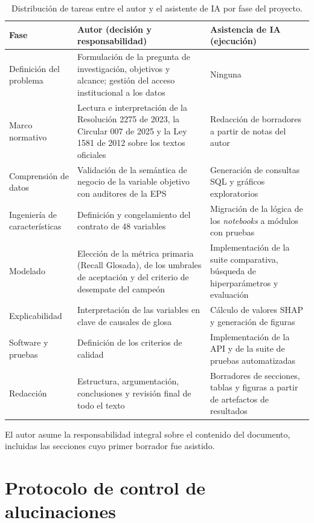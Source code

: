 \documentclass[12pt,letterpaper]{report}
\begin{document}
\begin{table}[H]
\centering
\caption{Distribución de tareas entre el autor y el asistente de IA por fase del proyecto.}
\label{tab:responsabilidad_ia}
\small
\begin{tabular}{@{}p{3cm}p{5.7cm}p{5.6cm}@{}}
\toprule
\textbf{Fase} & \textbf{Autor (decisión y responsabilidad)} & \textbf{Asistencia de IA (ejecución)} \\
\midrule
Definición del problema & Formulación de la pregunta de investigación, objetivos y
alcance; gestión del acceso institucional a los datos & Ninguna \\
Marco normativo & Lectura e interpretación de la Resolución 2275 de 2023, la Circular
007 de 2025 y la Ley 1581 de 2012 sobre los textos oficiales & Redacción de borradores
a partir de notas del autor \\
Comprensión de datos & Validación de la semántica de negocio de la variable objetivo
con auditores de la EPS & Generación de consultas SQL y gráficos exploratorios \\
Ingeniería de características & Definición y congelamiento del contrato de 48
variables & Migración de la lógica de los \textit{notebooks} a módulos con pruebas \\
Modelado & Elección de la métrica primaria (Recall Glosada), de los umbrales de
aceptación y del criterio de desempate del campeón & Implementación de la suite
comparativa, búsqueda de hiperparámetros y evaluación \\
Explicabilidad & Interpretación de las variables en clave de causales de glosa & Cálculo
de valores SHAP y generación de figuras \\
Software y pruebas & Definición de los criterios de calidad & Implementación de la API
y de la suite de pruebas automatizadas \\
Redacción & Estructura, argumentación, conclusiones y revisión final de todo el texto &
Borradores de secciones, tablas y figuras a partir de artefactos de resultados \\
\bottomrule
\end{tabular}
\end{table}

El autor asume la responsabilidad integral sobre el contenido del documento, incluidas
las secciones cuyo primer borrador fue asistido.

\section{Protocolo de control de alucinaciones}
\label{sec:control_alucinaciones}
\end{document}
